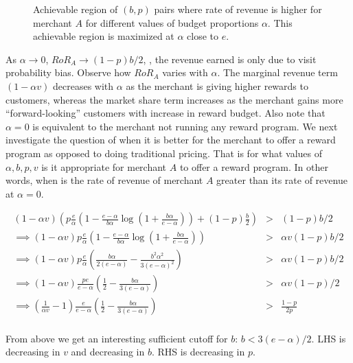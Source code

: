 \begin{figure}[t!]
\caption{Achievable region of $(b,p)$ pairs where rate of revenue is higher for merchant $A$ for different values of budget proportions $\alpha$. This achievable region is maximized at $\alpha$ close to $e$.}
\end{figure}

As $\alpha \to 0$, $RoR_A \to (1-p)b/2$, \ie, the revenue earned is only due to visit probability bias.
Observe how $RoR_A$ varies with $\alpha$.
The marginal revenue term $(1-\alpha v)$ decreases with $\alpha$ as the merchant is giving higher rewards to customers, whereas the market share term increases as the merchant gains more ``forward-looking'' customers with increase in reward budget.
Also note that $\alpha = 0$ is equivalent to the merchant not running any reward program.
We next investigate the question of when it is better for the merchant to offer a reward program as opposed to doing traditional pricing.
That is for what values of $\alpha, b, p, v$ is it appropriate for merchant $A$ to offer a reward program.
In other words, when is the rate of revenue of merchant $A$ greater than its rate of revenue at $\alpha = 0$.

\begin{align*}
 (1-\alpha v) \left(p\frac{e}{\alpha}\left(1-\frac{e-\alpha}{b\alpha}\log\left(1+\frac{b\alpha}{e-\alpha}\right)\right) + (1-p)\frac{b}{2}\right) &>& (1-p)b/2\\
\implies (1-\alpha v)p\frac{e}{\alpha}\left(1-\frac{e-\alpha}{b\alpha}\log\left(1+\frac{b\alpha}{e-\alpha}\right)\right) &>& \alpha v (1-p)b/2\\
\implies (1-\alpha v)p\frac{e}{\alpha}\left(\frac{b\alpha}{2(e-\alpha)} - \frac{b^2\alpha^2}{3(e-\alpha)^2}\right) &>& \alpha v (1-p)b/2\\
\implies (1-\alpha v)\frac{pe}{e-\alpha}\left(\frac{1}{2} - \frac{b\alpha}{3(e-\alpha)}\right) &>& \alpha v (1-p)/2\\
\implies \left(\frac{1}{\alpha v}-1\right)\frac{e}{e-\alpha}\left(\frac{1}{2} - \frac{b\alpha}{3(e-\alpha)}\right) &>&  \frac{1-p}{2p}\\
\end{align*}

From above we get an interesting sufficient cutoff for $b$: $b < 3(e-\alpha)/2$.
LHS is decreasing in $v$ and decreasing in $b$.
RHS is decreasing in $p$.

